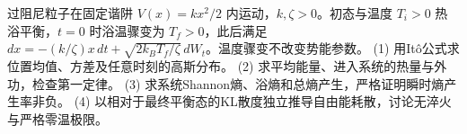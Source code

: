 过阻尼粒子在固定谐阱 \(V(x)=kx^2/2\) 内运动，\(k,\zeta>0\)。初态与温度 \(T_i>0\) 热浴平衡，\(t=0\) 时浴温骤变为 \(T_f>0\)，此后满足 \(dx=-(k/\zeta)x\,dt+\sqrt{2k_BT_f/\zeta}\,dW_t\)。温度骤变不改变势能参数。
(1) 用Itô公式求位置均值、方差及任意时刻的高斯分布。
(2) 求平均能量、进入系统的热量与外功，检查第一定律。
(3) 求系统Shannon熵、浴熵和总熵产生，严格证明瞬时熵产生率非负。
(4) 以相对于最终平衡态的KL散度独立推导自由能耗散，讨论无淬火与严格零温极限。

